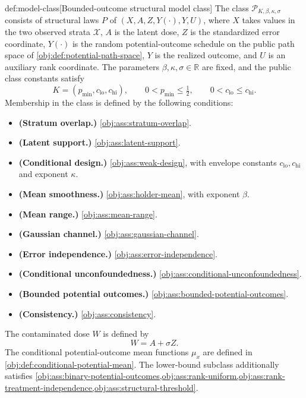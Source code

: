 \documentclass[11pt]{article}
\begin{document}
\begin{definitionv}{def:model-class}[Bounded-outcome structural model class]
The class \(\mathcal P_{K,\beta,\kappa,\sigma}\) consists of structural laws \(P\) of \((X,A,Z,Y(\cdot),Y,U)\), where \(X\) takes values in the two observed strata \(\mathcal X\), \(A\) is the latent dose, \(Z\) is the standardized error coordinate, \(Y(\cdot)\) is the random potential-outcome schedule on the public path space of \cref{obj:def:potential-path-space}, \(Y\) is the realized outcome, and \(U\) is an auxiliary rank coordinate. The parameters \(\beta,\kappa,\sigma\in\mathbb R\) are fixed, and the public class constants satisfy
\[
K=(p_{\min},c_{\mathrm{lo}},c_{\mathrm{hi}}),
\qquad
0<p_{\min}\le \tfrac12,
\qquad
0<c_{\mathrm{lo}}\le c_{\mathrm{hi}}.
\]
Membership in the class is defined by the following conditions:
\begin{itemize}
\item \textbf{(Stratum overlap.)} \cref{obj:ass:stratum-overlap}.
\item \textbf{(Latent support.)} \cref{obj:ass:latent-support}.
\item \textbf{(Conditional design.)} \cref{obj:ass:weak-design}, with envelope constants \(c_{\mathrm{lo}},c_{\mathrm{hi}}\) and exponent \(\kappa\).
\item \textbf{(Mean smoothness.)} \cref{obj:ass:holder-mean}, with exponent \(\beta\).
\item \textbf{(Mean range.)} \cref{obj:ass:mean-range}.
\item \textbf{(Gaussian channel.)} \cref{obj:ass:gaussian-channel}.
\item \textbf{(Error independence.)} \cref{obj:ass:error-independence}.
\item \textbf{(Conditional unconfoundedness.)} \cref{obj:ass:conditional-unconfoundedness}.
\item \textbf{(Bounded potential outcomes.)} \cref{obj:ass:bounded-potential-outcomes}.
\item \textbf{(Consistency.)} \cref{obj:ass:consistency}.
\end{itemize}
The contaminated dose \(W\) is defined by
\[
W=A+\sigma Z.
\]
The conditional potential-outcome mean functions \(\mu_x\) are defined in \cref{obj:def:conditional-potential-mean}. The lower-bound subclass additionally satisfies \cref{obj:ass:binary-potential-outcomes,obj:ass:rank-uniform,obj:ass:rank-treatment-independence,obj:ass:structural-threshold}.
\end{definitionv}
\end{document}
